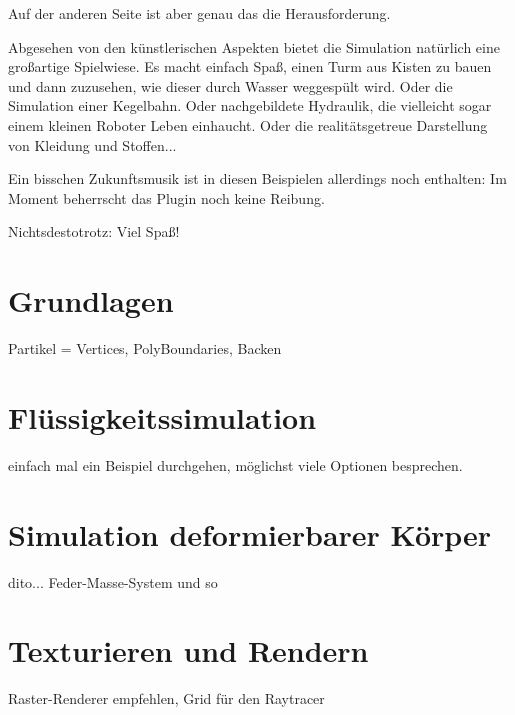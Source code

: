 \documentclass[12pt,a4paper]{scrartcl}
\begin{document}
Auf der anderen Seite ist aber genau das die Herausforderung.

Abgesehen von den künstlerischen Aspekten bietet die Simulation
natürlich eine großartige Spielwiese. Es macht einfach Spaß, einen Turm
aus Kisten zu bauen und dann zuzusehen, wie dieser durch Wasser
weggespült wird. Oder die Simulation einer Kegelbahn. Oder nachgebildete
Hydraulik, die vielleicht sogar einem kleinen Roboter Leben einhaucht.
Oder die realitätsgetreue Darstellung von Kleidung und Stoffen...

Ein bisschen Zukunftsmusik ist in diesen Beispielen allerdings noch
enthalten: Im Moment beherrscht das Plugin noch keine Reibung.

Nichtsdestotrotz: Viel Spaß!

\pagebreak
\section{Grundlagen}
Partikel = Vertices, PolyBoundaries, Backen

\section{Flüssigkeitssimulation}
einfach mal ein Beispiel durchgehen, möglichst viele Optionen
besprechen.

\section{Simulation deformierbarer Körper}
dito... Feder-Masse-System und so

\section{Texturieren und Rendern}
Raster-Renderer empfehlen, Grid für den Raytracer
\end{document}
